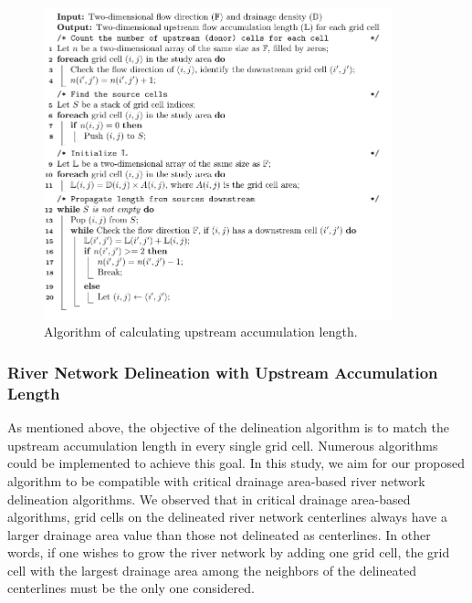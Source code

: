 \documentclass[water,article,submit,pdftex,moreauthors]{Definitions/mdpi}
\begin{document}
\begin{figure}[H]
  \includegraphics[width=0.9\textwidth]{upstream.pdf}
  \caption{Algorithm of calculating upstream accumulation length.\label{fig:upstream}}
\end{figure}

\subsubsection{River Network Delineation with Upstream Accumulation Length}
\label{sec:network}

As mentioned above, the objective of the delineation algorithm is to match the upstream accumulation length in every single grid cell. Numerous algorithms could be implemented to achieve this goal. In this study, we aim for our proposed algorithm to be compatible with critical drainage area-based river network delineation algorithms. We observed that in critical drainage area-based algorithms, grid cells on the delineated river network centerlines always have a larger drainage area value than those not delineated as centerlines. In other words, if one wishes to grow the river network by adding one grid cell, the grid cell with the largest drainage area among the neighbors of the delineated centerlines must be the only one considered.
\end{document}
